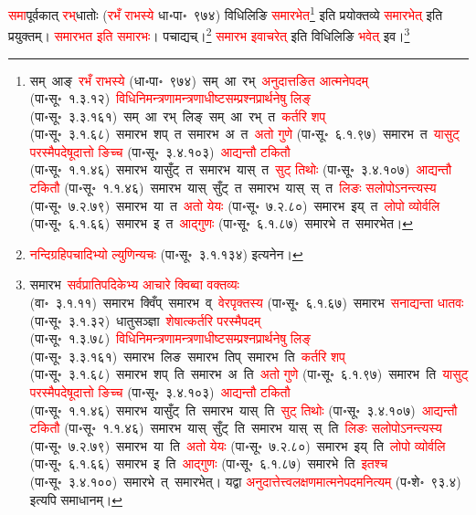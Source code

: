 \fontsize{14}{21}\selectfont\begin{sloppypar}\justifying\noindent\hspace{10mm} \textcolor{red}{समा}\-पूर्वकात् \textcolor{red}{रभ्‌}\-धातोः (\textcolor{red}{रभँ राभस्ये} धा॰पा॰~९७४) विधिलिङि \textcolor{red}{समारभेत}\footnote{सम्~आङ्~\textcolor{red}{रभँ राभस्ये} (धा॰पा॰~९७४)~\arrow सम्~आ~रभ्~\arrow \textcolor{red}{अनुदात्तङित आत्मने\-पदम्} (पा॰सू॰~१.३.१२)~\arrow \textcolor{red}{विधि\-निमन्‍त्रणामन्‍त्रणाधीष्‍ट\-सम्प्रश्‍न\-प्रार्थनेषु लिङ्} (पा॰सू॰~३.३.१६१)~\arrow सम्~आ~रभ्~लिङ्~\arrow सम्~आ~रभ्~त~\arrow \textcolor{red}{कर्तरि शप्‌} (पा॰सू॰~३.१.६८)~\arrow समारभ~शप्~त~\arrow समारभ~अ~त~\arrow \textcolor{red}{अतो गुणे} (पा॰सू॰~६.१.९७)~\arrow समारभ~त~\arrow \textcolor{red}{यासुट् परस्मैपदेषूदात्तो ङिच्च} (पा॰सू॰~३.४.१०३)~\arrow \textcolor{red}{आद्यन्तौ टकितौ} (पा॰सू॰~१.१.४६)~\arrow समारभ~यासुँट्~त~\arrow समारभ~यास्~त~\arrow \textcolor{red}{सुट् तिथोः} (पा॰सू॰~३.४.१०७)~\arrow \textcolor{red}{आद्यन्तौ टकितौ} (पा॰सू॰~१.१.४६)~\arrow समारभ~यास्~सुँट्~त~\arrow समारभ~यास्~स्~त~\arrow \textcolor{red}{लिङः सलोपोऽनन्त्यस्य} (पा॰सू॰~७.२.७९)~\arrow समारभ~या~त~\arrow \textcolor{red}{अतो येयः} (पा॰सू॰~७.२.८०)~\arrow समारभ~इय्~त~\arrow \textcolor{red}{लोपो व्योर्वलि} (पा॰सू॰~६.१.६६)~\arrow समारभ~इ~त~\arrow \textcolor{red}{आद्गुणः} (पा॰सू॰~६.१.८७)~\arrow समारभे~त~\arrow समारभेत।} इति प्रयोक्तव्ये \textcolor{red}{समारभेत्} इति प्रयुक्तम्। \textcolor{red}{समारभत इति समारभः}। पचाद्यच्।\footnote{\textcolor{red}{नन्दि\-ग्रहि\-पचादिभ्यो ल्युणिन्यचः} (पा॰सू॰~३.१.१३४) इत्यनेन।} \textcolor{red}{समारभ इवाचरेत्} इति विधिलिङि \textcolor{red}{भवेत्} इव।\footnote{समारभ~\arrow \textcolor{red}{सर्वप्राति\-पदिकेभ्य आचारे क्विब्वा वक्तव्यः} (वा॰~३.१.११)~\arrow समारभ~क्विँप्~\arrow समारभ~व्~\arrow \textcolor{red}{वेरपृक्तस्य} (पा॰सू॰~६.१.६७)~\arrow समारभ~\arrow \textcolor{red}{सनाद्यन्ता धातवः} (पा॰सू॰~३.१.३२)~\arrow धातुसञ्ज्ञा~\arrow \textcolor{red}{शेषात्कर्तरि परस्मैपदम्} (पा॰सू॰~१.३.७८)~\arrow \textcolor{red}{विधि\-निमन्‍त्रणामन्‍त्रणाधीष्‍ट\-सम्प्रश्‍न\-प्रार्थनेषु लिङ्} (पा॰सू॰~३.३.१६१)~\arrow समारभ~लिङ~\arrow समारभ~तिप्~\arrow समारभ~ति~\arrow \textcolor{red}{कर्तरि शप्‌} (पा॰सू॰~३.१.६८)~\arrow समारभ~शप्~ति~\arrow समारभ~अ~ति~\arrow \textcolor{red}{अतो गुणे} (पा॰सू॰~६.१.९७)~\arrow समारभ~ति~\arrow \textcolor{red}{यासुट् परस्मैपदेषूदात्तो ङिच्च} (पा॰सू॰~३.४.१०३)~\arrow \textcolor{red}{आद्यन्तौ टकितौ} (पा॰सू॰~१.१.४६)~\arrow समारभ~यासुँट्~ति~\arrow समारभ~यास्~ति~\arrow \textcolor{red}{सुट् तिथोः} (पा॰सू॰~३.४.१०७)~\arrow \textcolor{red}{आद्यन्तौ टकितौ} (पा॰सू॰~१.१.४६)~\arrow समारभ~यास्~सुँट्~ति~\arrow समारभ~यास्~स्~ति~\arrow \textcolor{red}{लिङः सलोपोऽनन्त्यस्य} (पा॰सू॰~७.२.७९)~\arrow समारभ~या~ति~\arrow\textcolor{red}{अतो येयः} (पा॰सू॰~७.२.८०)~\arrow समारभ~इय्~ति~\arrow \textcolor{red}{लोपो व्योर्वलि} (पा॰सू॰~६.१.६६)~\arrow समारभ~इ~ति~\arrow \textcolor{red}{आद्गुणः} (पा॰सू॰~६.१.८७)~\arrow समारभे~ति~\arrow \textcolor{red}{इतश्च} (पा॰सू॰~३.४.१००)~\arrow समारभे~त्~\arrow समारभेत्। यद्वा \textcolor{red}{अनुदात्तेत्त्व\-लक्षणमात्मने\-पदमनित्यम्} (प॰शे॰~९३.४) इत्यपि समाधानम्।
}\end{sloppypar}
